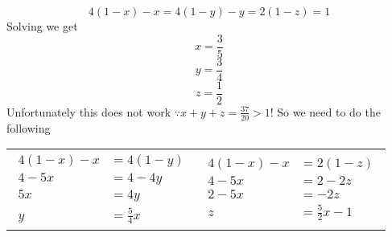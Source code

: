 \documentclass[12pt,letter]{article}
\begin{document}
\[
    4(1-x) -x = 4(1-y) - y = 2(1-z) = 1
\]
Solving we get
\[
    x = \frac35
\]\[
    y = \frac34
\]\[
    z = \frac12
\]
Unfortunately this does not work $\because x+y+z=\frac{37}{20}>1$! So we need to do the following
\begin{figure*}[h]
\centering
\begin{tabular}{p{}p{}}
    {\begin{align*}
    4(1-x) - x &= 4(1-y) \\
        4 - 5x &= 4 - 4y\\
        5x &= 4y\\
        y &= \frac54x
    \end{align*}}
    & 
    {\begin{align*}
        4(1-x) -x &= 2(1-z)\\
        4 - 5x &= 2 - 2z \\
        2 - 5x &= -2z\\
        z &= \frac52x - 1
    \end{align*}}
\end{tabular}
\end{figure*}
\end{document}
